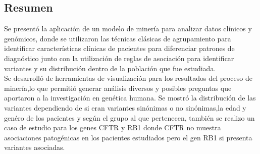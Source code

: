 \subsection*{Resumen}

Se presentó la aplicación de un modelo de minería para analizar datos clínicos y genómicos, donde se utilizaron las técnicas clásicas de  agrupamiento para identificar características clínicas de pacientes para diferenciar patrones de diagnóstico junto con la utilización de reglas de asociación para identificar variantes y su distribución dentro de la población que fue estudiada.\\

Se desarrolló de herramientas de visualización para los resultados del proceso de minería,lo que permitió generar análisis diversos y posibles preguntas que aportaron a la investigación en genética humana. Se mostró la distribución de las variantes dependiendo de si eran variantes sinónimas o no sinónimas,la edad y genéro de los pacientes y según el grupo al que pertenecen, también se realizo un caso de estudio para los genes CFTR y RB1 donde CFTR no muestra asociaciones patogénicas en los pacientes estudiados pero el gen RB1 si presenta variantes asociadas.




   
